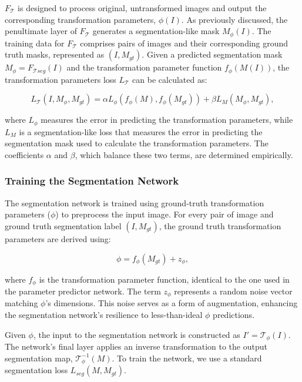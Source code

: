 \(F_{\mathcal{T}}\) is designed to process original, untransformed images and output the corresponding transformation parameters, \( \phi(I) \). As previously discussed, the penultimate layer of \(F_{\mathcal{T}}\) generates a segmentation-like mask \( M_\phi(I) \). The training data for \(F_{\mathcal{T}}\) comprises pairs of images and their corresponding ground truth masks, represented as \((I, M_{gt})\). Given a predicted segmentation mask $M_\phi = F_{\mathcal{T}seg}(I)$ and the transformation parameter function $f_\phi(M(I))$, the transformation parameters loss $L_\mathcal{T}$ can be calculated as:

\begin{equation}
	L_\mathcal{T}(I, M_\phi, M_{gt}) = \alpha L_\phi(f_\phi(M), f_\phi(M_{gt})) + \beta L_{M}(M_\phi, M_{gt}),
\end{equation}

where $L_\phi$ measures the error in predicting the transformation parameters, while $L_{M}$ is a segmentation-like loss that measures the error in predicting the segmentation mask used to calculate the transformation parameters. The coefficients \(\alpha\) and \(\beta\), which balance these two terms, are determined empirically.

\subsubsection{Training the Segmentation Network}

The segmentation network is trained using ground-truth transformation parameters (\(\phi\)) to preprocess the input image. For every pair of image and ground truth segmentation label \((I, M_{gt})\), the ground truth transformation parameters are derived using:

\begin{equation}
	\phi = f_\phi(M_{gt}) + z_\phi,
\end{equation}

where \(f_\phi\) is the transformation parameter function, identical to the one used in the parameter predictor network. The term \(z_\phi\) represents a random noise vector matching \(\phi\)'s dimensions. This noise serves as a form of augmentation, enhancing the segmentation network's resilience to less-than-ideal \(\phi\) predictions.

Given $\phi$, the input to the segmentation network is constructed as $I' = \mathcal{T}_\phi(I)$. The network's final layer applies an inverse transformation to the output segmentation map, \(\mathcal{T}^{-1}_\phi(M)\). To train the network, we use a standard segmentation loss $L_{seg}(M, M_{gt})$.

